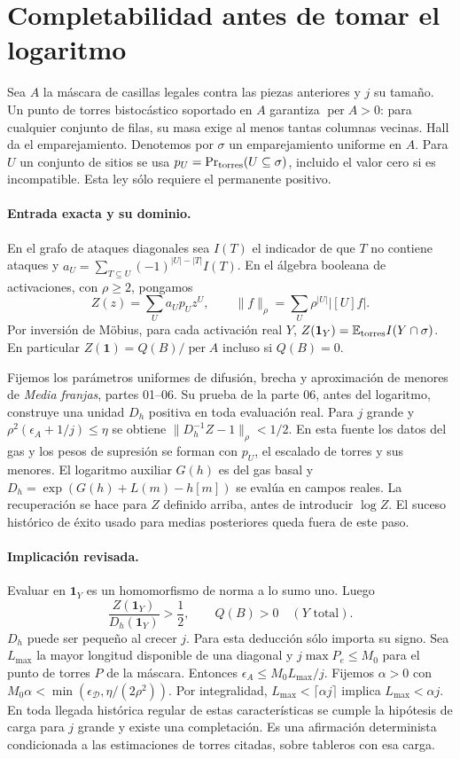 \section{Completabilidad antes de tomar el logaritmo}
Sea $A$ la máscara de casillas legales contra las piezas anteriores y $j$ su tamaño.
Un punto de torres bistocástico soportado en $A$ garantiza $\operatorname{per}A>0$:
para cualquier conjunto de filas, su masa exige al menos tantas columnas vecinas.
Hall da el emparejamiento. Denotemos por $\sigma$ un emparejamiento uniforme en $A$.
Para $U$ un conjunto de sitios se usa $p_U=\Pr_{\rm torres}(U\subseteq\sigma)$,
incluido el valor cero si es incompatible. Esta ley sólo requiere el permanente positivo.

\paragraph{Entrada exacta y su dominio.}
En el grafo de ataques diagonales sea $I(T)$ el indicador de que $T$ no contiene ataques
y $a_U=\sum_{T\subseteq U}(-1)^{|U|-|T|}I(T)$.
En el álgebra booleana de activaciones, con $\rho\ge2$, pongamos
\[
 Z(z)=\sum_U a_U p_U z^U,\qquad
 \|f\|_\rho=\sum_U\rho^{|U|}|[U]f|.
\]
Por inversión de Möbius, para cada activación real $Y$,
$Z(\mathbf1_Y)=\mathbb E_{\rm torres} I(Y\cap\sigma)$. En particular
$Z(\mathbf1)=Q(B)/\operatorname{per}A$ incluso si $Q(B)=0$.

Fijemos los parámetros uniformes de difusión, brecha y aproximación de menores
de \emph{Media franjas}, partes 01--06. Su prueba de la parte 06, antes del logaritmo,
construye una unidad $D_h$ positiva en toda evaluación real. Para $j$ grande y
$\rho^2(\epsilon_A+1/j)\le\eta$ se obtiene $\|D_h^{-1}Z-1\|_\rho<1/2$.
En esta fuente los datos del gas y los pesos de supresión se forman con $p_U$,
el escalado de torres y sus menores. El logaritmo auxiliar $G(h)$ es del gas basal
y $D_h= \exp(G(h)+L(m)-h[m])$ se evalúa en campos reales.
La recuperación se hace para $Z$ definido arriba, antes de introducir $\log Z$.
El suceso histórico de éxito usado para medias posteriores queda fuera de este paso.

\paragraph{Implicación revisada.}
Evaluar en $\mathbf1_Y$ es un homomorfismo de norma a lo sumo uno. Luego
\[
 \frac{Z(\mathbf1_Y)}{D_h(\mathbf1_Y)}>\frac12,\qquad
                       Q(B)>0\quad(Y\text{ total}).
\]
$D_h$ puede ser pequeño al crecer $j$. Para esta deducción sólo importa su signo.
Sea $L_{\max}$ la mayor longitud disponible de una diagonal y
$j\max P_e\le M_0$ para el punto de torres $P$ de la máscara.
Entonces $\epsilon_A\le M_0L_{\max}/j$. Fijemos $\alpha>0$ con
$M_0\alpha<\min(\epsilon_{\mathcal D},\eta/(2\rho^2))$.
Por integralidad,
$L_{\max}<\lceil\alpha j\rceil$ implica $L_{\max}<\alpha j$.
En toda llegada histórica regular de estas características se cumple la hipótesis
de carga para $j$ grande y existe una completación. Es una afirmación determinista
condicionada a las estimaciones de torres citadas, sobre tableros con esa carga.

